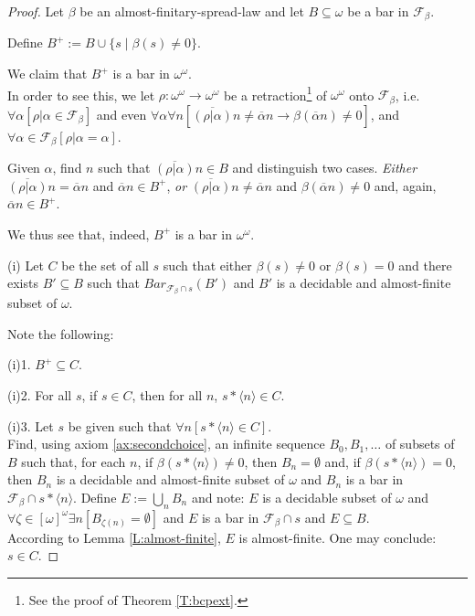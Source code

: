 \documentclass[a4paper]{amsart}
\theoremstyle{plain}
\begin{document}
\begin{proof} Let $\beta$ be an almost-finitary-spread-law
 and let $B\subseteq\omega$ be a bar in $\mathcal{F}_\beta$.  
 
 Define $B^+:= B \cup \{s\mid \beta(s)\neq 0\}$.
   
   We claim that $B^+$ is a bar in $\omega^\omega$. \\In order to see this, we let $\rho:\omega^\omega \rightarrow \omega^\omega$ be a retraction\footnote{See the proof of Theorem \ref{T:bcpext}.} of $\omega^\omega$ onto $\mathcal{F}_\beta$, i.e.  \\$\forall \alpha[\rho|\alpha \in \mathcal{F}_\beta]$ and even $\forall \alpha \forall n[\overline{(\rho|\alpha)}n \neq \overline \alpha n\rightarrow \beta(\overline\alpha n)\neq 0]$, and $\forall \alpha \in \mathcal{F}_\beta[\rho|\alpha =\alpha]$.
   
   Given $\alpha$, find $n$ such that $\overline{(\rho|\alpha)}n \in B$ and distinguish two cases. \textit{Either} \\$\overline{(\rho|\alpha)}n =\overline \alpha n$ and $\overline \alpha n \in B^+$, \textit{or} $\overline{(\rho|\alpha)}n \neq\overline \alpha n$ and $\beta(\overline \alpha n)\neq 0$ and, again, $\overline \alpha n \in B^+$. 
   
   
   We thus see that, indeed, $B^+$ is a bar in $\omega^\omega$.


\smallskip (i) Let $C$ be the set of all $s$ such that either $\beta(s)\neq 0$ or $\beta(s)=0$ and there exists $B'\subseteq B$ such that $Bar_{\mathcal{F}_\beta\cap s}(B')$ and $B'$ is a decidable and almost-finite subset of $\omega$. 




\smallskip Note the following:

(i)1. $B^+\subseteq C$.

(i)2. For all $s$, if $s\in C$, then for all $n$, $s\ast\langle n \rangle \in C$.

(i)3. Let $s$ be given such that $\forall n[s\ast\langle n  \rangle \in C]$. \\Find, using axiom \ref{ax:secondchoice},  an infinite sequence $B_0, B_1, \ldots$ of subsets of $B$ such that, for each $n$, if $\beta(s\ast\langle n \rangle)\neq 0$, then $B_n=\emptyset$ and, if $\beta(s\ast\langle n \rangle)=0$, then $B_n$ is a decidable and almost-finite subset of $\omega$ and $B_n$ is a bar in $\mathcal{F}_\beta\cap s\ast\langle n\rangle$.  Define $E:=\bigcup_n B_n$ and note: $E$ is a decidable subset of $\omega$ and $\forall \zeta \in [\omega]^\omega\exists n[B_{\zeta(n)}=\emptyset]$ and $E$ is a bar in $\mathcal{F}_\beta\cap s$ and $E\subseteq B$. \\  According to 
 Lemma \ref{L:almost-finite}, $E$ is almost-finite.  One may conclude: $s \in C$.   


\end{proof}
\end{document}
